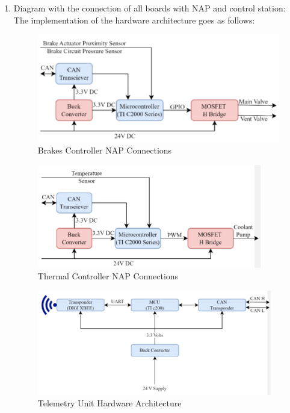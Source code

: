 \begin{enumerate}
    \item Diagram with the connection of all boards with NAP and control station:
The implementation of the hardware architecture goes as follows:
    \begin{figure}
        \centering
        \includegraphics{texfiles/elec/eimg/Brakes_architecture}
        \caption{Brakes Controller NAP Connections}
        \label{fig:Brakes Controller NAP Connections}
    \end{figure}
 \begin{figure}
        \centering
        \includegraphics{texfiles/elec/eimg/Thermal_architecture}
        \caption{Thermal Controller NAP Connections}
        \label{fig:Thermal Controller NAP Connections}
    \end{figure}
 \begin{figure}
        \centering
        \includegraphics[width=\textwidth]{texfiles/elec/eimg/telem_architecture.png}
        \caption{Telemetry Unit Hardware Architecture}
        \label{fig:Telemetry Unit Hardware Architecture}
    \end{figure}


\end{enumerate}
